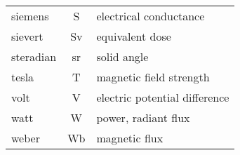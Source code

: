 \begin{minipage}{0.66\linewidth}
\begin{tabu}{lcl}
        siemens     & \si{\siemens}     & electrical conductance \\
        sievert     & \si{\sievert}     & equivalent dose \\
        steradian   & \si{\steradian}   & solid angle \\
        tesla       & \si{\tesla}       & magnetic field strength \\
        volt        & \si{\volt}        & electric potential difference \\
        watt        & \si{\watt}        & power, radiant flux\\
        weber       & \si{\weber}       & magnetic flux \\
        \bottomrule
    \end{tabu}
    \vspace{1.46\baselineskip}
\end{minipage}

